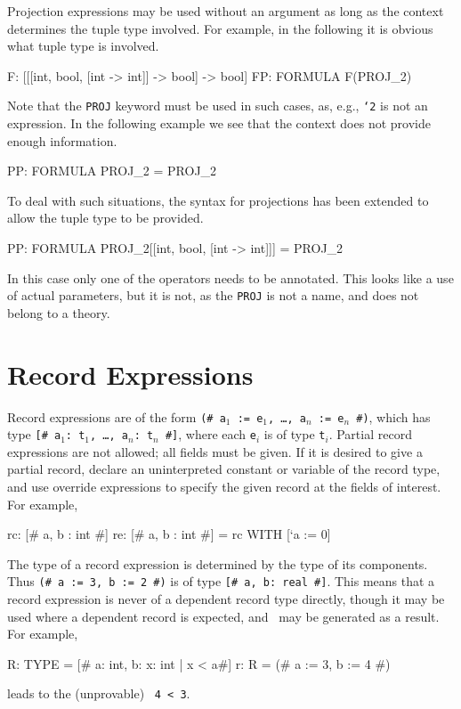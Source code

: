 Projection expressions may be used without an argument as long as the
context determines the tuple type involved.  For example, in the following
it is obvious what tuple type is involved.
\begin{pvsex}
  F: [[[int, bool, [int -> int]] -> bool] -> bool]
  FP: FORMULA F(PROJ_2)
\end{pvsex}
Note that the \texttt{PROJ} keyword must be used in such cases, as, e.g.,
\texttt{`2} is not an expression.  In the following example we see that
the context does not provide enough information.
\begin{pvsex}
  PP: FORMULA PROJ_2 = PROJ_2
\end{pvsex}
To deal with such situations, the syntax for projections has been extended
to allow the tuple type to be provided.
\begin{pvsex}
  PP: FORMULA PROJ_2[[int, bool, [int -> int]]] = PROJ_2
\end{pvsex}
In this case only one of the operators needs to be annotated.  This looks
like a use of actual parameters, but it is not, as the \texttt{PROJ} is
not a name, and does not belong to a theory.


\section{Record Expressions}\label{record-expressions}

Record expressions are of the form \texttt{(\# a$_1$ := e$_1$, \ldots,
a$_n$ := e$_n$ \#)}, which has type \texttt{[\# a$_1$:\ t$_1$, \ldots,
a$_n$:\ t$_n$ \#]}, where each \texttt{e$_i$} is of type \texttt{t$_i$}.
Partial record expressions are not allowed; all fields must be given.  If
it is desired to give a partial record, declare an uninterpreted constant
or variable of the record type, and use override expressions to specify
the given record at the fields of interest.  For example,
\begin{pvsex}
  rc: [# a, b : int #]
  re: [# a, b : int #] = rc WITH [`a := 0]
\end{pvsex}

The type of a record expression is determined by the type of its
components.  Thus \texttt{(\# a := 3, b := 2 \#)} is of type \texttt{[\# a,
b: real \#]}.  This means that a record expression is never of a dependent
record type directly, though it may be used where a dependent record is
expected, and \tccs\ may be generated as a result.  For example,
\begin{pvsex}
  R: TYPE = [# a: int, b: \setb{}x: int | x < a\sete #]
  r: R = (# a := 3, b := 4 #)
\end{pvsex}
%
leads to the (unprovable) \tcc\ \texttt{4 < 3}.

